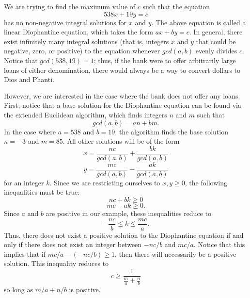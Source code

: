 \documentclass{article}
\begin{document}
	
We are trying to find the maximum value of $c$ such that the equation
\begin{equation}
	538x + 19y = c
\end{equation}
has no non-negative integral solutions for $x$ and $y$. The above equation is called a linear Diophantine equation, which takes the form $ax + by = c$. In general, there exist infinitely many integral solutions (that is, integers $x$ and $y$ that could be negative, zero, or positive) to the equation whenever $gcd(a, b)$ evenly divides $c$. Notice that $gcd(538, 19) = 1$; thus, if the bank were to offer arbitrarily large loans of either denomination, there would always be a way to convert dollars to Dios and Phanti.

However, we are interested in the case where the bank does not offer any loans. First, notice that a base solution for the Diophantine equation can be found via the extended Euclidean algorithm, which finds integers $n$ and $m$ such that
\begin{equation}
	gcd(a, b) = an + bm.
\end{equation}
In the case where $a = 538$ and $b = 19$, the algorithm finds the base solution $n = -3$ and $m = 85$. All other solutions will be of the form
\begin{equation}
	x = \frac{nc}{gcd(a, b)} + \frac{bk}{gcd(a, b)}
\end{equation}
\begin{equation}
	y = \frac{mc}{gcd(a, b)} - \frac{ak}{gcd(a, b)}
\end{equation}
for an integer $k$. Since we are restricting ourselves to $x, y \geq 0$, the following inequalities must be true:
\begin{equation}
	nc + bk \geq 0
\end{equation}
\begin{equation}
	mc - ak \geq 0.
\end{equation}
Since $a$ and $b$ are positive in our example, these inequalities reduce to
\begin{equation}
	-\frac{nc}{b} \leq k \leq \frac{mc}{a}.
\end{equation}
Thus, there does not exist a positive solution to the Diophantine equation if and only if there does not exist an integer between $-nc / b$ and $mc / a$. Notice that this implies that if $mc / a - (-nc / b) \geq 1$, then there will necessarily be a positive solution. This inequality reduces to
\begin{equation}
	c \geq \frac{1}{\frac{m}{a} + \frac{n}{b}}
\end{equation}
so long as $m / a + n / b$ is positive.
\end{document}
